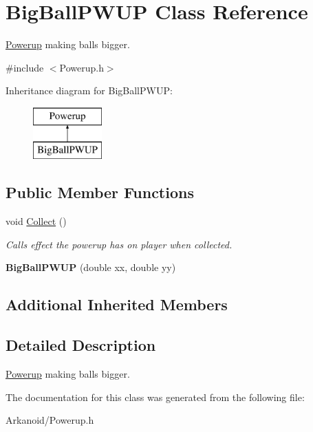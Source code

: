 \hypertarget{class_big_ball_p_w_u_p}{}\section{Big\+Ball\+P\+W\+UP Class Reference}
\label{class_big_ball_p_w_u_p}


\hyperlink{class_powerup}{Powerup} making balls bigger.  




{\ttfamily \#include $<$Powerup.\+h$>$}

Inheritance diagram for Big\+Ball\+P\+W\+UP\+:\begin{figure}[H]
\begin{center}
\leavevmode
\includegraphics[height=2.000000cm]{class_big_ball_p_w_u_p}
\end{center}
\end{figure}
\subsection*{Public Member Functions}
\begin{DoxyCompactItemize}
\item 
\mbox{\label{class_big_ball_p_w_u_p_aec72b39626dc1fae8315baf26c017905}} 
void \hyperlink{class_big_ball_p_w_u_p_aec72b39626dc1fae8315baf26c017905}{Collect} ()
\begin{DoxyCompactList}\small\item\em Calls effect the powerup has on player when collected. \end{DoxyCompactList}\item 
\mbox{\label{class_big_ball_p_w_u_p_ad85fcac851119b10f530d2c3387eeeb7}} 
{\bfseries Big\+Ball\+P\+W\+UP} (double xx, double yy)
\end{DoxyCompactItemize}
\subsection*{Additional Inherited Members}


\subsection{Detailed Description}
\hyperlink{class_powerup}{Powerup} making balls bigger. 

The documentation for this class was generated from the following file\+:\begin{DoxyCompactItemize}
\item 
Arkanoid/Powerup.\+h\end{DoxyCompactItemize}
